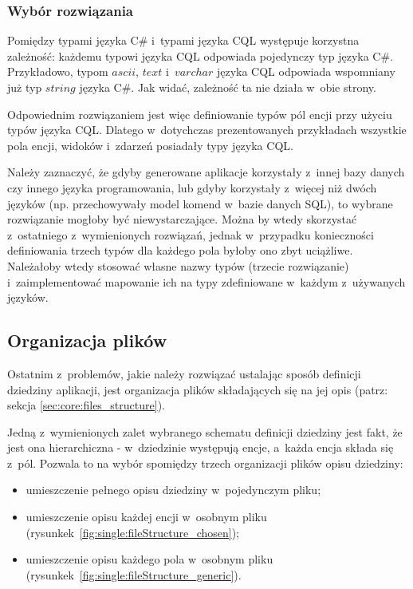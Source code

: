 \subsubsection{Wybór rozwiązania}

Pomiędzy typami języka C\# i~typami języka CQL występuje korzystna zależność: każdemu typowi języka CQL odpowiada pojedynczy typ języka C\#.
Przykładowo, typom $ascii$, $text$ i~$varchar$ języka CQL odpowiada wspomniany już typ $string$ języka C\#.
Jak widać, zależność ta nie działa w~obie strony.

Odpowiednim rozwiązaniem jest więc definiowanie typów pól encji przy użyciu typów języka CQL.
Dlatego w~dotychczas prezentowanych przykładach wszystkie pola encji, widoków i~zdarzeń posiadały typy języka CQL.

Należy zaznaczyć, że gdyby generowane aplikacje korzystały z~innej bazy danych czy innego języka programowania, lub gdyby korzystały z~więcej niż dwóch języków (np. przechowywały model komend w~bazie danych SQL), to wybrane rozwiązanie mogłoby być niewystarczające.
Można by wtedy skorzystać z~ostatniego z~wymienionych rozwiązań, jednak w~przypadku konieczności definiowania trzech typów dla każdego pola byłoby ono zbyt uciążliwe.
Należałoby wtedy stosować własne nazwy typów (trzecie rozwiązanie) i~zaimplementować mapowanie ich na typy zdefiniowane w~każdym z~używanych języków.


\subsection{Organizacja plików}

Ostatnim z~problemów, jakie należy rozwiązać ustalając sposób definicji dziedziny aplikacji, jest organizacja plików składających się na jej opis (patrz: sekcja \ref{sec:core:files_structure}).

Jedną z~wymienionych zalet wybranego schematu definicji dziedziny jest fakt, że jest ona hierarchiczna - w~dziedzinie występują encje, a~każda encja składa się z~pól.
Pozwala to na wybór spomiędzy trzech organizacji plików opisu dziedziny:

\begin{itemize}
 \item umieszczenie pełnego opisu dziedziny w~pojedynczym pliku;
 \item umieszczenie opisu każdej encji w~osobnym pliku (rysunkek~\ref{fig:single:fileStructure_chosen});
 \item umieszczenie opisu każdego pola w~osobnym pliku (rysunkek~\ref{fig:single:fileStructure_generic}).
\end{itemize}

